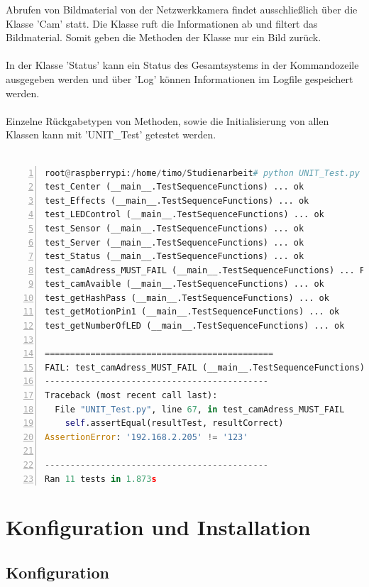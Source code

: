 Abrufen von Bildmaterial von der Netzwerkkamera findet ausschließlich über die Klasse 'Cam' statt. Die Klasse ruft die Informationen ab und filtert das Bildmaterial. Somit geben die Methoden der Klasse nur ein Bild zurück. \\\\
In der Klasse 'Status' kann ein Status des Gesamtsystems in der Kommandozeile ausgegeben werden und über 'Log' können Informationen im Logfile gespeichert werden. \\\\
Einzelne Rückgabetypen von Methoden, sowie die Initialisierung von allen Klassen kann mit 'UNIT\_Test' getestet werden. \\\\

\begin{lstlisting}[caption=Ausgabe der Klasse UNIT\_Test, language=python, frame=single, breaklines=true,columns=fullflexible, commentstyle=\color{gray}\upshape, captionpos=b, numbers = left]
root@raspberrypi:/home/timo/Studienarbeit# python UNIT_Test.py 
test_Center (__main__.TestSequenceFunctions) ... ok
test_Effects (__main__.TestSequenceFunctions) ... ok
test_LEDControl (__main__.TestSequenceFunctions) ... ok
test_Sensor (__main__.TestSequenceFunctions) ... ok
test_Server (__main__.TestSequenceFunctions) ... ok
test_Status (__main__.TestSequenceFunctions) ... ok
test_camAdress_MUST_FAIL (__main__.TestSequenceFunctions) ... FAIL
test_camAvaible (__main__.TestSequenceFunctions) ... ok
test_getHashPass (__main__.TestSequenceFunctions) ... ok
test_getMotionPin1 (__main__.TestSequenceFunctions) ... ok
test_getNumberOfLED (__main__.TestSequenceFunctions) ... ok

=============================================
FAIL: test_camAdress_MUST_FAIL (__main__.TestSequenceFunctions)
--------------------------------------------
Traceback (most recent call last):
  File "UNIT_Test.py", line 67, in test_camAdress_MUST_FAIL
    self.assertEqual(resultTest, resultCorrect)
AssertionError: '192.168.2.205' != '123'

--------------------------------------------
Ran 11 tests in 1.873s
\end{lstlisting}
\section{Konfiguration und Installation}
\subsection{Konfiguration}
